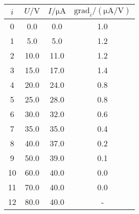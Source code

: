 \begin{table}
    \centering
    \begin{tabular}{S[table-format=:.0] S S S}
        \toprule
        {$i$} &
        {$U / \unit{\volt}$} &
        {$I/ \unit{\micro\ampere}$} &
        {$\text{grad}_i/ (\unit{\micro\ampere\per\volt})$} \\
           & 0.0       & 0.0    & 1.0 \\
        1   & 5.0       & 5.0    & 1.2 \\
        2   & 10.0      & 11.0    & 1.2 \\
        3   & 15.0      & 17.0    & 1.4 \\
        4   & 20.0      & 24.0    & 0.8 \\
        5   & 25.0      & 28.0    & 0.8 \\
        6   & 30.0      & 32.0    & 0.6 \\
        7   & 35.0      & 35.0    & 0.4 \\
        8   & 40.0      & 37.0    & 0.2 \\
        9   & 50.0      & 39.0    & 0.1 \\
        10   & 60.0     & 40.0    & 0.0 \\
        11   & 70.0     & 40.0    & 0.0 \\
        12   & 80.0     & 40.0    & {-} \\
        \bottomrule
    \end{tabular}
    \caption{}
\end{table}